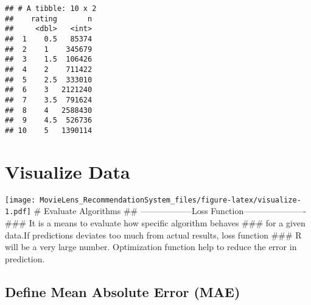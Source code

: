 \documentclass[
]{article}
\newenvironment{Shaded}{\begin{snugshade}}{\end{snugshade}}
\newcommand{\DataTypeTok}[1]{\textcolor[rgb]{0.13,0.29,0.53}{#1}}
\newcommand{\KeywordTok}[1]{\textcolor[rgb]{0.13,0.29,0.53}{\textbf{#1}}}
\newcommand{\NormalTok}[1]{#1}
\newcommand{\OperatorTok}[1]{\textcolor[rgb]{0.81,0.36,0.00}{\textbf{#1}}}
\newcommand{\StringTok}[1]{\textcolor[rgb]{0.31,0.60,0.02}{#1}}
\begin{document}
\begin{verbatim}
## # A tibble: 10 x 2
##    rating       n
##     <dbl>   <int>
##  1    0.5   85374
##  2    1    345679
##  3    1.5  106426
##  4    2    711422
##  5    2.5  333010
##  6    3   2121240
##  7    3.5  791624
##  8    4   2588430
##  9    4.5  526736
## 10    5   1390114
\end{verbatim}

\hypertarget{visualize-data}{%
\section{Visualize Data}\label{visualize-data}}

\begin{Shaded}
\end{Shaded}

\texttt{[image: MovieLens\_RecommendationSystem\_files/figure-latex/visualize-1.pdf]}
\# Evaluate Algorithms \#\# ------------------Loss
Function---------------------- \#\#\# It is a means to evaluate how
specific algorithm behaves \#\#\# for a given data.If predictions
deviates too much from actual results, loss function \#\#\# R will be a
very large number. Optimization function help to reduce the error in
prediction.

\hypertarget{define-mean-absolute-error-mae}{%
\subsection{Define Mean Absolute Error
(MAE)}\label{define-mean-absolute-error-mae}}
\end{document}
